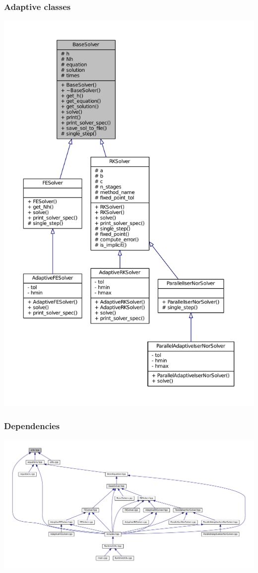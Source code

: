 \documentclass{beamer}
\begin{document}
\begin{frame} %
	\frametitle{Adaptive classes}
	\centering
	\includegraphics[width=\linewidth]{etc/classes_full.pdf} %
\end{frame}


\begin{frame} %
	\frametitle{Dependencies}
	\centering
	\includegraphics[width=\textwidth]{etc/headers.pdf}
\end{frame}
\end{document}
